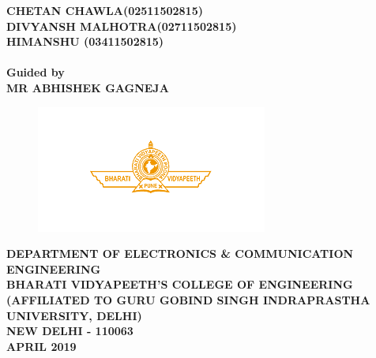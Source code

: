 \begin{center}
\large{\textbf{CHETAN CHAWLA\hspace{20mm}(02511502815)\\}}
\large{\textbf{DIVYANSH MALHOTRA\hspace{7mm}(02711502815)\\}}
\large{\textbf{HIMANSHU\hspace{35mm}  (03411502815)\\}}
\large{\textbf{\\Guided by\\}}
\Large{\textbf{MR ABHISHEK GAGNEJA}}\\
\begin{figure}[hbtp]
  \centering
  \vspace{-0.8in}
    \includegraphics[scale= 1.5]{SummerInterReport/project/Images-Major/bvp.png}
    \vspace{-0.8in}
\end{figure}

\vspace{-0.5cm}
\large{\textbf{DEPARTMENT OF ELECTRONICS & COMMUNICATION ENGINEERING\\ BHARATI VIDYAPEETH'S COLLEGE OF ENGINEERING\\
(AFFILIATED TO GURU GOBIND SINGH INDRAPRASTHA UNIVERSITY, DELHI)\\ NEW DELHI - 110063\\
\vspace{0.7cm}APRIL 2019}}\\
\newpage
\end{center}






